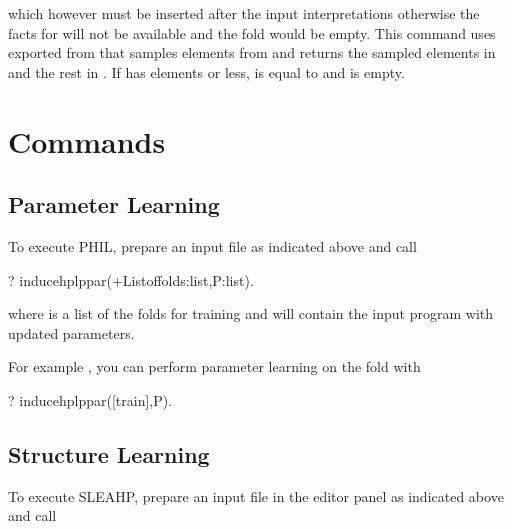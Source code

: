 \documentclass[letterpaper,10pt,english]{sphinxmanual}
\begin{document}
which however must be inserted after the input interpretations otherwise the facts for  will not be available and the fold  would be empty.
This command uses  exported from  that samples  elements from  and returns the sampled elements in  and the rest in .
If  has  elements or less,  is equal to  and  is empty.


\section{Commands}
\label{\detokenize{index:commands}}

\subsection{Parameter Learning}
\label{\detokenize{index:parameter-learning}}
To execute PHIL, prepare an input file as indicated above and call

%
\begin{sphinxVerbatim}[commandchars=\\\{\}]
?\PYGZhy{} induce\PYGZus{}hplp\PYGZus{}par(+List\PYGZus{}of\PYGZus{}folds:list,\PYGZhy{}P:list).
\end{sphinxVerbatim}

where  is a list of the folds for training and  will contain the input program with updated parameters.

For example , you can perform parameter learning on the  fold with

%
\begin{sphinxVerbatim}[commandchars=\\\{\}]
?\PYGZhy{} induce\PYGZus{}hplp\PYGZus{}par([train],P).
\end{sphinxVerbatim}


\subsection{Structure Learning}
\label{\detokenize{index:structure-learning}}
To execute SLEAHP, prepare an input file in the editor panel as indicated above and call
\end{document}
